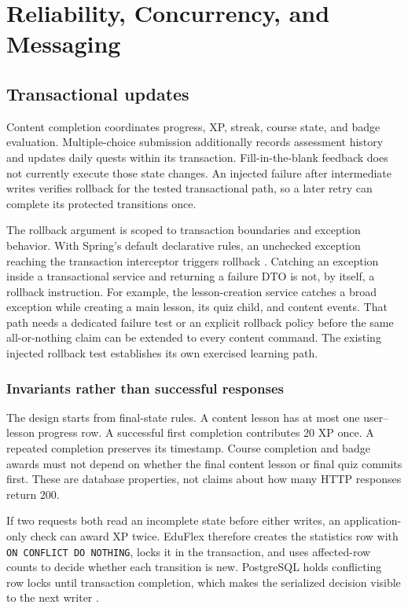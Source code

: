 \documentclass[12pt,a4paper,oneside]{report}
\begin{document}
\chapter{Reliability, Concurrency, and Messaging}
\section{Transactional updates}
Content completion coordinates progress, XP, streak, course state, and badge
evaluation. Multiple-choice submission additionally records assessment history and
updates daily quests within its transaction. Fill-in-the-blank feedback does not
currently execute those state changes. An injected failure after intermediate
writes verifies rollback for the tested transactional path, so a later retry can
complete its protected transitions once.

The rollback argument is scoped to transaction boundaries and exception behavior.
With Spring's default declarative rules, an unchecked exception reaching the
transaction interceptor triggers rollback \cite{springrollback}. Catching an
exception inside a transactional service and returning a failure DTO is not, by
itself, a rollback instruction. For example, the lesson-creation service catches a
broad exception while creating a main lesson, its quiz child, and content events.
That path needs a dedicated failure test or an explicit rollback policy before the
same all-or-nothing claim can be extended to every content command. The existing
injected rollback test establishes its own exercised learning path.

\subsection{Invariants rather than successful responses}
The design starts from final-state rules. A content lesson has at most one
user--lesson progress row. A successful first completion contributes 20 XP once.
A repeated completion preserves its timestamp. Course completion and badge awards
must not depend on whether the final content lesson or final quiz commits first.
These are database properties, not claims about how many HTTP responses return 200.

If two requests both read an incomplete state before either writes, an application-only
check can award XP twice. EduFlex therefore creates the statistics row with
\texttt{ON CONFLICT DO NOTHING}, locks it in the transaction, and uses affected-row
counts to decide whether each transition is new. PostgreSQL holds conflicting row
locks until transaction completion, which makes the serialized decision visible to
the next writer \cite{postgreslocks}.
\end{document}
